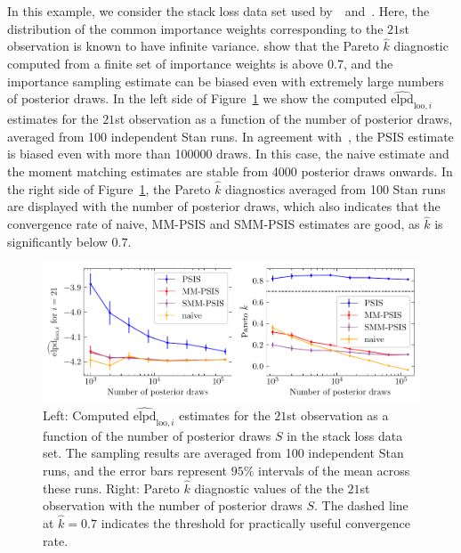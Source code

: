 \documentclass[12pt]{article}
\begin{document}
In this example, we consider the stack loss data set used by~\citet{peruggia1997variability}~and~\citet{vehtari2017practical}. Here, the
distribution of the common importance weights corresponding to the
$21$st observation is known to have infinite variance.
\citet{vehtari2017practical} show that the Pareto $\hat{k}$ diagnostic computed
from a finite set of importance weights is above $0.7$, and the
importance sampling estimate can be biased even with extremely large numbers of
posterior draws.
In the left side of Figure~\ref{fig:stackloss_diff} we show the computed $\widehat{\mathrm{elpd}}_{\mathrm{loo}, i}$
estimates for the $21$st observation as a function of the number of
posterior draws, averaged from 100 independent Stan runs.
In agreement with~\citet{vehtari2017practical},
the PSIS estimate is biased even with more than 100000 draws.
In this case, the naive estimate and the moment matching estimates
are stable from 4000 posterior draws onwards.
In the right side of Figure~\ref{fig:stackloss_diff}, the Pareto
$\hat{k}$ diagnostics averaged from 100 Stan runs are displayed 
with the number of posterior draws, which also indicates that the convergence rate
of naive, MM-PSIS and SMM-PSIS estimates are good, as $\hat{k}$ is significantly below $0.7$.





\begin{figure}[h]
\centering
\includegraphics[width=\textwidth]{figs/stackloss_diff_comb.pdf}
\caption{Left: Computed $\widehat{\mathrm{elpd}}_{\mathrm{loo},i}$
estimates for the $21$st observation as a function of the number of posterior draws $S$
in the stack loss data set. The sampling results are averaged from 100 independent Stan runs, and the error bars represent $95 \%$
intervals of the mean across these runs. Right: Pareto $\hat{k}$ diagnostic values of the the $21$st observation with the number of posterior draws $S$. The dashed line
at $\hat{k} = 0.7$ indicates the threshold for practically useful convergence rate.} \label{fig:stackloss_diff}
\end{figure}
\end{document}
